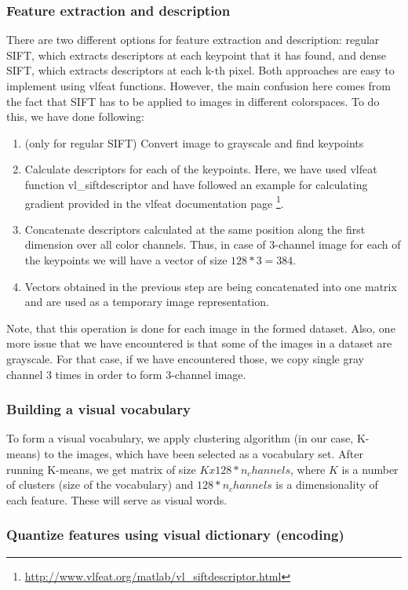 \documentclass{article}
\begin{document}
\subsubsection{Feature extraction and description}
\label{feature_extraction}
There are two different options for feature extraction and description: regular SIFT, which extracts descriptors at each keypoint that it has found, and dense SIFT, which extracts descriptors at each k-th pixel. Both approaches are easy to implement using vlfeat functions. However, the main confusion here comes from the fact that SIFT has to be applied to images in different colorspaces. To do this, we have done following:
\begin{enumerate}
    \item (only for regular SIFT) Convert image to grayscale and find keypoints
    \item Calculate descriptors for each of the keypoints. Here, we have used vlfeat function vl\_siftdescriptor and have followed an example for calculating gradient provided in the vlfeat documentation page \footnote{\url{http://www.vlfeat.org/matlab/vl_siftdescriptor.html}}.
    \item Concatenate descriptors calculated at the same position along the first dimension over all color channels. Thus, in case of 3-channel image for each of the keypoints we will have a vector of size $128*3 = 384$.
    \item Vectors obtained in the previous step are being concatenated into one matrix and are used as a temporary image representation.
\end{enumerate}
Note, that this operation is done for each image in the formed dataset.
Also, one more issue that we have encountered is that some of the images in a dataset are grayscale. For that case, if we have encountered those, we copy single gray channel 3 times in order to form 3-channel image.
\subsubsection{Building a visual vocabulary}

To form a visual vocabulary, we apply clustering algorithm (in our case, K-means) to the images, which have been selected as a vocabulary set. After running K-means, we get matrix of size $K x 128*n_channels$, where $K$ is a number of clusters (size of the vocabulary) and $128*n_channels$ is a dimensionality of each feature. These will serve as visual words.

\subsubsection{Quantize features using visual dictionary (encoding)}
\end{document}
